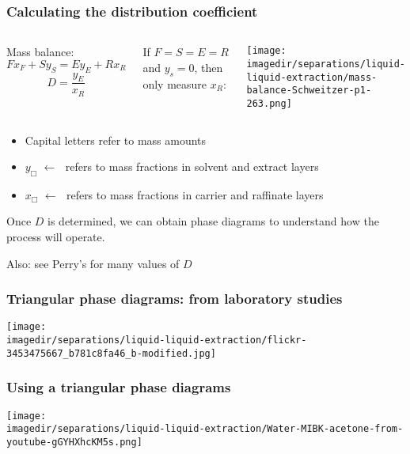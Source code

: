 \begin{frame}\frametitle{Calculating the distribution coefficient {\color{myOrange}{(in the lab only)}}}
	\begin{columns}[t]
			Mass balance:
			\[ F x_F + S y_S = E y_E + R x_R \]
			\[ D = \frac{y_E}{x_R} \]

			\vspace{12pt}
			If $F = S = E = R$ and $y_s = 0$, then only measure $x_R$:
				
			\begin{center}
				\texttt{[image: \\imagedir/separations/liquid-liquid-extraction/mass-balance-Schweitzer-p1-263.png]}
			\end{center}
	\end{columns}
	\begin{itemize}
		\item	Capital letters refer to mass amounts
		\item	$y_\Box \,\, \leftarrow\,\,$  refers to mass fractions in solvent and extract layers
		\item	$x_\Box \,\, \leftarrow\,\,$  refers to mass fractions in carrier and raffinate layers 
	\end{itemize}
	Once $D$ is determined, we can obtain phase diagrams to understand how the process will operate.
	
	\vspace{12pt}
	Also: see Perry's for many values of $D$
\end{frame}

\begin{frame}\frametitle{Triangular phase diagrams: from laboratory studies}
	\begin{center}
		\texttt{[image: \\imagedir/separations/liquid-liquid-extraction/flickr-3453475667\_b781c8fa46\_b-modified.jpg]}
	\end{center}
	\vspace{-12pt}
\end{frame}

\begin{frame}\frametitle{Using a triangular phase diagrams}
	\begin{center}
		\texttt{[image: \\imagedir/separations/liquid-liquid-extraction/Water-MIBK-acetone-from-youtube-gGYHXhcKM5s.png]}
	\end{center}
	\vspace{-12pt}
\end{frame}

